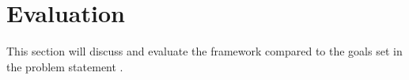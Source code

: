 \section{Evaluation}

This section will discuss and evaluate the framework compared to the goals set in the problem statement . 




